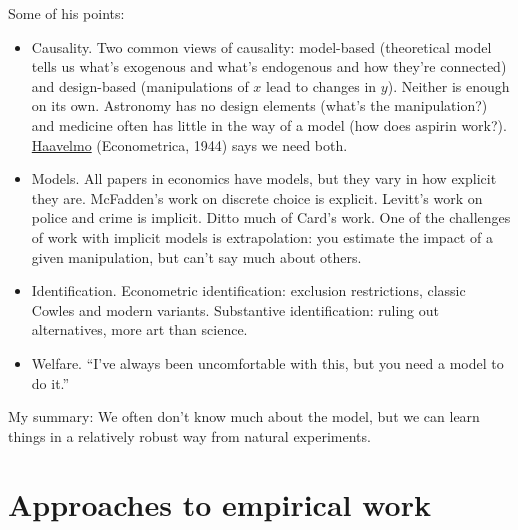 \documentclass[11pt,letterpaper]{article}
\begin{document}
Some of his points:
%
\begin{itemize}
\item Causality.
Two common views of causality:
model-based (theoretical model tells us what's exogenous and what's endogenous
and how they're connected)
and design-based (manipulations of $x$ lead to changes in $y$).
Neither is enough on its own.
Astronomy has no design elements (what's the manipulation?) and medicine
often has little in the way of a model (how does aspirin work?).
\href{http://www.jstor.org/stable/1906935}{Haavelmo} 
(Econometrica, 1944) says we need both.
\item Models.
All papers in economics have models, but they vary in how explicit they are.
McFadden's work on discrete choice is explicit.
Levitt's work on police and crime is implicit. Ditto much of Card's work.
One of the challenges of work with implicit models is extrapolation:
you estimate the impact of a given manipulation, but can't say much about others.
\item Identification.
Econometric identification: exclusion restrictions, classic Cowles and modern variants.
Substantive identification:  ruling out alternatives, more art than science.

\item Welfare.
``I've always been uncomfortable with this, but you need a model to do it.''
\end{itemize}
%
My summary:
We often don't know much about the model,
but we can learn things in a relatively robust way
from natural experiments.


\section{Approaches to empirical work}
\end{document}
